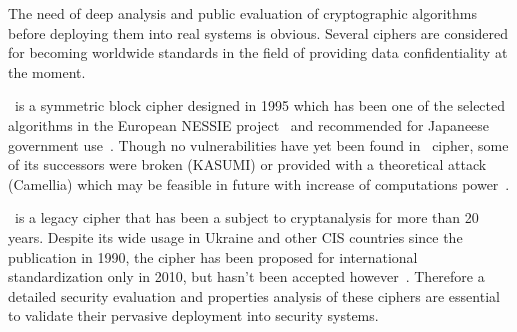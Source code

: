The need of deep analysis and public evaluation of cryptographic algorithms
before deploying them into real systems is obvious. Several ciphers are
considered for becoming worldwide standards in the field of providing data
confidentiality at the moment.

\misty\ is a symmetric block cipher designed in 1995 which has been one of the
selected algorithms in the European NESSIE project~\cite{Preneel_neweuropean}
and recommended for Japaneese government use~\cite{cryptrec:misty}. Though no
vulnerabilities have yet been found in \misty\ cipher, some of its successors
were broken (KASUMI) or provided with a theoretical attack (Camellia) which may
be feasible in future with increase of computations
power~\cite{Biryukov03decanniere}.

\gost\ is a legacy cipher that has been a subject to cryptanalysis for more than
20 years. Despite its wide usage in Ukraine and other CIS countries since the
publication in 1990, the cipher has been proposed for international
standardization only in 2010, but hasn't been accepted
however~\cite{isoiec-18033}. Therefore a detailed security evaluation and
properties analysis of these ciphers are essential to validate their pervasive
deployment into security systems.

